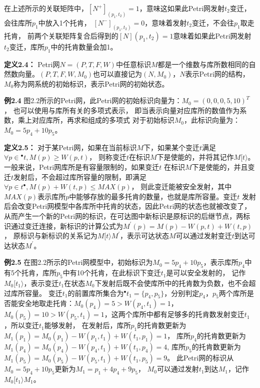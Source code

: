     在上述所示的关联矩阵中，$[N^+]_{(p_1,t_2)}=1$，意味这如果此Petri网发射$t_2$变迁，会往库所$p_1$中放入1个托肯，
    $[N^-]_{(p_1,t_2)}=0$，意味着发射$t_2$变迁，不会往$p_1$取走托肯，
    前两个关联矩阵复合后得到的$[N](p_1,t_2)=1$意味着如果此Petri网发射$t_2$变迁，库所$p_1$中的托肯数量会加1。

    \textbf{定义2.4}\cite{Liu2010}\textbf{：}
    Petri网$N = (P,T,F,W)$中任意标识$M$都是一个维数与库所数相同的自然数向量。$(P,T,F,W,M_{0})$也可以直接记为$(N,M_{0})$，$N$表示Petri网的结构，$M_{0}$称为网系统的初始标识，表示Petri网的初始状态。

    \textbf{例2.4}\hspace{0.5em} 图2.2所示的Petri网，此Petri网的初始标识向量为：$M_{0}=(0,0,0,5,10)^{T}$，
    也可以使用与库所有关的多项式表示，
    即当表示向量对应库所的数值作为系数，乘上对应库所，再求和组成的多项式
    对于初始标识$M_{0}$，此标识向量为：
    $M_{0}=5p_{4}+10p_{5}$。

    \textbf{定义2.5}\cite{Liu2013}\textbf{：}
    对于某Petri网，如果在当前标识$M$下，如果某个变迁$t$满足$\forall p\in{^\bullet t}, M(p) \geq W(p,t)$，
    则称变迁$t$在标识$M$下是使能的，并将其记作$M[t\rangle$。一般来说，Petri网库所是有容量限制的，如果变迁$t$ 在标识$M$下是使能的，并且变迁$t$发射后，不会超过库所容量的限制，即满足$\forall p \in t^{\bullet}, M(p)+W(t,p) \leq MAX(p)$，
    则此变迁能被安全发射，其中$MAX(p)$表示库所$p$中能够存放的最多托肯的数量，也就是库所容量。变迁$t$ 发射后会改变Petri网模型中各库所中托肯的状态，因此Petri网的状态也就被改变了，从而产生一个新的Petri网的标识，在可达图中新标识是原标识的后继节点，两标识通过变迁连接，新标识的计算公式为$M^{\prime}(p)=M(p)-W(p,t)+W(t,p)$，
    原标识与新标识的关系记为$M[t\rangle M^{\prime}$，表示可达状态$M$可以通过发射变迁$t$到达可达状态$M^{\prime}$。

    \textbf{例2.5}\hspace{0.5em}
    在图2.2所示的Petri网模型中，初始标识为$M_{0}=5p_{4}+10p_{5}$，表示库所$p_{4}$中有5个托肯，库所$p_{5}$中有10个托肯，在此标识下变迁$t_1$是可以安全发射的，
    记作$M_0 [t_1\rangle$，表示变迁$t_1$在状态$M_{0}$下发射后既不会使库所中的托肯数为负数，也不会超过库所容量。
    变迁$t_1$的前置库所集合为$^\bullet t_1 = \{p_4, p_5\}$，分别判定$p_4$，$p_5$两个库所是否能安全地取走托肯：$M_0(p_4)=5 > W(p_4, t_1)=1$，$M_0(p_5)=10 > W(p_5, t_1)=1$，这两个库所中都有足够多的托肯数发射变迁$t_1$，所以变迁$t_1$能够发射，
    在发射后，库所$p_1$的托肯数更新为$M_1(p_1)=M_0(p_1)-W(p_1, t_1)+W(t_1, p_1)=1$，
    库所$p_4$的托肯数更新为$M_1(p_4)=M_0(p_4)-W(p_4, t_1)+W(t_1, p_4)=4$, 
    库所$p_5$的托肯数更新为$M_1(p_5)=M_0(p_5)-W(p_5, t_1)+W(t_1, p_5)=9$。
    此Petri网的标识从$M_0=5p_4+10p_5$更新为$M_1=p_1+4p_4+9p_5$，
    $M_0$可以通过发射$t_1$到达$M_1$，记作$M_0[t_1\rangle M_1$。

